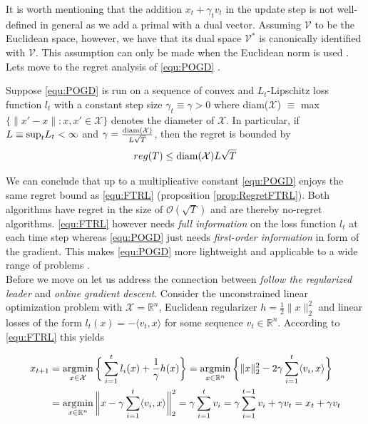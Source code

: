 It is worth mentioning that the addition $x_t + \gamma_t v_t$ in the update step is not well-defined in general as we add a primal with a dual vector. Assuming $\mathcal{V}$ to be the Euclidean space, however, we have that its dual space $\mathcal{V}^*$ is canonically identified with $\mathcal{V}$. This assumption can only be made when the Euclidean norm is used \cite{HDRmertikopoulos}. Lets move to the regret analysis of \ref{equ:POGD} \cite[Theorem 2.2]{HDRmertikopoulos}.

\begin{proposition}\label{prop:regretPOGD}
    Suppose \ref{equ:POGD} is run on a sequence of convex and $L_t$-Lipschitz loss function $l_t$ with a constant step size $\gamma_t \equiv \gamma > 0$ where  \textnormal{diam}($\mathcal{X}$) $\equiv$ \textnormal{max}$\{\|x'-x\|:x,x' \in \mathcal{X}\}$ denotes the diameter of $\mathcal{X}$. In particular, if $L \equiv \textnormal{sup}_t L_t < \infty$ and $\gamma = \frac{\textnormal{diam}(\mathcal{X})}{L\sqrt{T}}$, then the regret is bounded by 
    \[reg(T) \le \textnormal{diam}(\mathcal{X})L\sqrt{T}\]
\end{proposition}

We can conclude that up to a multiplicative constant \ref{equ:POGD} enjoys the same regret bound as \ref{equ:FTRL} (proposition \ref{prop:RegretFTRL}). Both algorithms have regret in the size of $\mathcal{O}(\sqrt{T})$ and are thereby no-regret algorithms. \ref{equ:FTRL} however needs \textit{full information} on the loss function $l_t$ at each time step whereas \ref{equ:POGD} just needs \textit{first-order information} in form of the gradient. This makes \ref{equ:POGD} more lightweight and applicable to a wide range of problems \cite{HDRmertikopoulos}. \\

Before we move on let us address the connection between \textit{follow the regularized leader} and \textit{online gradient descent}. Consider the unconstrained linear optimization problem with $\mathcal{X} = \mathbb{R}^n$, Euclidean regularizer $h = \frac{1}{2}\|x\|_2^2$ and linear losses of the form $l_t(x) = -\langle v_t,x\rangle$ for some sequence $v_t \in \mathbb{R}^n$. According to \ref{equ:FTRL} this yields

\begin{equation*}
    \begin{split}
        x_{t+1} & = \operatorname*{\arg\!\min}_{x \in \mathcal{X}} \bigg\{\sum_{i=1}^t l_i(x) + \frac{1}{\gamma}h(x)\bigg\} = \operatorname*{\arg\!\min}_{x \in \mathbb{R}^n} \bigg\{\|x\|_2^2 - 2\gamma\sum_{i=1}^t \langle v_i,x\rangle\bigg\} \\
        & = \operatorname*{\arg\!\min}_{x \in \mathbb{R}^n} \bigg\|x - \gamma\sum_{i=1}^t \langle v_i,x\rangle\bigg\|_2^2 = \gamma\sum_{i=1}^t v_i = \gamma\sum_{i=1}^{t-1} v_i + \gamma v_t = x_t + \gamma v_t
    \end{split}
\end{equation*} \\

